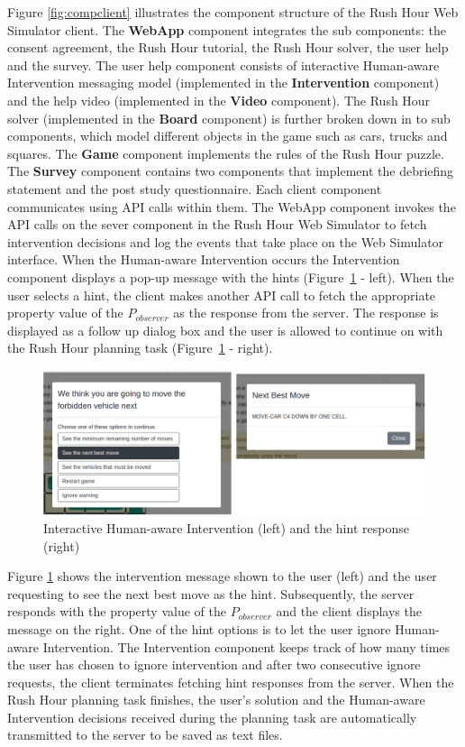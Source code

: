 Figure \ref{fig:compclient} illustrates the component structure of the Rush Hour Web Simulator client.
The \textbf{WebApp} component integrates the sub components: the consent agreement, the Rush Hour tutorial, the Rush Hour solver, the user help and the survey. 
The user help component consists of interactive Human-aware Intervention messaging model (implemented in the \textbf{Intervention} component) and the help video (implemented in the \textbf{Video} component).
The Rush Hour solver (implemented in the \textbf{Board} component) is further broken down in to sub components, which model different objects in the game such as cars, trucks and squares.
The \textbf{Game} component implements the rules of the Rush Hour puzzle.
The \textbf{Survey} component contains two components that implement the debriefing statement and the post study questionnaire.
Each client component communicates using API calls within them.
The WebApp component invokes the API calls on the sever component in the Rush Hour Web Simulator to fetch intervention decisions and log the events that take place on the Web Simulator interface.
When the Human-aware Intervention occurs the Intervention component displays a pop-up message with the hints (Figure~\ref{fig:help} - left).
When the user selects a hint, the client makes another API call to fetch the appropriate property value of the $P_{observer}$ as the response from the server. 
The response is displayed as a follow up dialog box and the user is allowed to continue on with the Rush Hour planning task (Figure~\ref{fig:help} - right). 
\begin{figure}[tpb]
  \centering
\includegraphics[width=\columnwidth]{img/alert.pdf}
  \caption{Interactive Human-aware Intervention (left) and the hint response (right)}
  \label{fig:help}
\end{figure}
Figure \ref{fig:help} shows the intervention message shown to the user (left) and  the user requesting to see the next best move as the hint. Subsequently, the server responds with the property value of the $P_{observer}$  and the client displays the message on the right.
One of the hint options is to let the user ignore Human-aware Intervention. 
The Intervention component keeps track of how many times the user has chosen to ignore intervention and after two consecutive ignore requests, the client terminates fetching hint responses from the server. 
When the Rush Hour planning task finishes, the user's solution and the Human-aware Intervention decisions received during the planning task are automatically transmitted to the server to be saved as text files.


